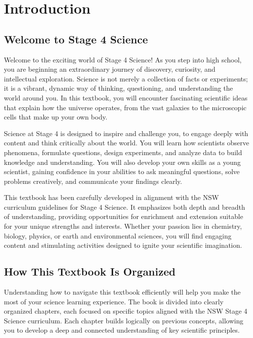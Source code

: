 \chapter{Introduction}

\section{Welcome to Stage 4 Science}

Welcome to the exciting world of Stage 4 Science! As you step into high school, you are beginning an extraordinary journey of discovery, curiosity, and intellectual exploration. Science is not merely a collection of facts or experiments; it is a vibrant, dynamic way of thinking, questioning, and understanding the world around you. In this textbook, you will encounter fascinating scientific ideas that explain how the universe operates, from the vast galaxies to the microscopic cells that make up your own body.

Science at Stage 4 is designed to inspire and challenge you, to engage deeply with content and think critically about the world. You will learn how scientists observe phenomena, formulate questions, design experiments, and analyze data to build knowledge and understanding. You will also develop your own skills as a young scientist, gaining confidence in your abilities to ask meaningful questions, solve problems creatively, and communicate your findings clearly.

This textbook has been carefully developed in alignment with the NSW curriculum guidelines for Stage 4 Science. It emphasizes both depth and breadth of understanding, providing opportunities for enrichment and extension suitable for your unique strengths and interests. Whether your passion lies in chemistry, biology, physics, or earth and environmental sciences, you will find engaging content and stimulating activities designed to ignite your scientific imagination.

\section{How This Textbook Is Organized}

Understanding how to navigate this textbook efficiently will help you make the most of your science learning experience. The book is divided into clearly organized chapters, each focused on specific topics aligned with the NSW Stage 4 Science curriculum. Each chapter builds logically on previous concepts, allowing you to develop a deep and connected understanding of key scientific principles.

